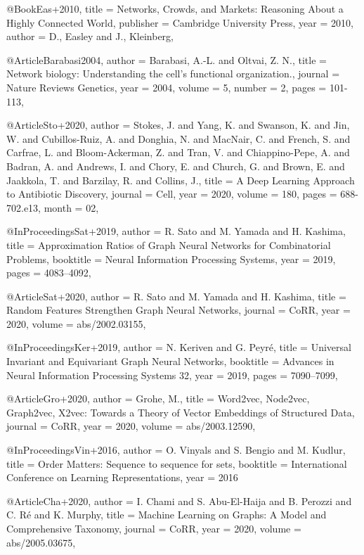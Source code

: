 @Book{Eas+2010,
  title     = {Networks, Crowds, and Markets: Reasoning About a Highly Connected World},
  publisher = {Cambridge University Press},
  year      = {2010},
  author    = {D., Easley and J., Kleinberg},
}

@Article{Barabasi2004,
  author  = {Barabasi, A.-L. and Oltvai, Z. N.},
  title   = {Network biology: Understanding the cell’s functional organization.},
  journal = {Nature Reviews Genetics},
  year    = {2004},
  volume  = {5},
  number  = {2},
  pages   = {101-113},
}

@Article{Sto+2020,
  author  = {Stokes, J. and Yang, K. and Swanson, K. and Jin, W. and Cubillos-Ruiz, A. and Donghia, N. and MacNair, C. and French, S. and Carfrae, L. and Bloom-Ackerman, Z. and Tran, V. and Chiappino-Pepe, A. and Badran, A. and Andrews, I. and Chory, E. and Church, G. and Brown, E. and Jaakkola, T. and Barzilay, R. and Collins, J.},
  title   = {A Deep Learning Approach to Antibiotic Discovery},
  journal = {Cell},
  year    = {2020},
  volume  = {180},
  pages   = {688-702.e13},
  month   = {02},
}

@InProceedings{Sat+2019,
  author    = {R. Sato and M. Yamada and H. Kashima},
  title     = {Approximation Ratios of Graph Neural Networks for Combinatorial Problems},
  booktitle = {Neural Information Processing Systems},
  year      = {2019},
  pages     = {4083--4092},
}

@Article{Sat+2020,
  author  = {R. Sato and M. Yamada and H. Kashima},
  title   = {Random Features Strengthen Graph Neural Networks},
  journal = {CoRR},
  year    = {2020},
  volume  = {abs/2002.03155},
}

@InProceedings{Ker+2019,
  author    = {N. Keriven and G. Peyr{\'{e}}},
  title     = {Universal Invariant and Equivariant Graph Neural Networks},
  booktitle = {Advances in Neural Information Processing Systems 32},
  year      = {2019},
  pages     = {7090--7099},
}

@Article{Gro+2020,
  author  = {Grohe, M.},
  title   = {{Word2vec, Node2vec, Graph2vec, X2vec:} {T}owards a Theory of Vector Embeddings of Structured Data},
  journal = {CoRR},
  year    = {2020},
  volume  = {abs/2003.12590},
}

@InProceedings{Vin+2016,
  author    = {O. Vinyals and S. Bengio and M. Kudlur},
  title     = {Order Matters: Sequence to sequence for sets},
  booktitle = {International Conference on Learning Representations},
  year      = {2016}
}

@Article{Cha+2020,
  author  = {I. Chami and S. Abu{-}El{-}Haija and B. Perozzi and C. R{\'{e}} and K. Murphy},
  title   = {Machine Learning on Graphs: {A} Model and Comprehensive Taxonomy},
  journal = {CoRR},
  year    = {2020},
  volume  = {abs/2005.03675},
}

